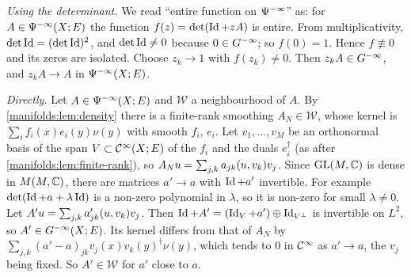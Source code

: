 \subsection*{}
\emph{Using the determinant.} We read ``entire function on $\Psi^{-\infty}$'' as: for
$A\in\Psi^{-\infty}(X;E)$ the function $f(z)=\det(\operatorname{Id}+zA)$ is entire. From multiplicativity,
$\det\operatorname{Id}=(\det\operatorname{Id})^2$, and $\det\operatorname{Id}\ne0$ because $0\in G^{-\infty}$; so $f(0)=1$. Hence $f\not\equiv0$
and its zeros are isolated. Choose $z_k\to1$ with $f(z_k)\ne0$. Then $z_kA\in G^{-\infty}$, and
$z_kA\to A$ in $\Psi^{-\infty}(X;E)$.

\emph{Directly.} Let $A\in\Psi^{-\infty}(X;E)$ and $\mathcal W$ a neighbourhood of $A$. By
\cref{manifolds:lem:density} there is a finite-rank smoothing $A_N\in\mathcal W$, whose kernel is
$\sum_if_i(x)e_i(y)\nu(y)$ with smooth $f_i$, $e_i$. Let $v_1,\dots,v_M$ be an orthonormal basis of the
span $V\subset\mathcal{C}^\infty(X;E)$ of the $f_i$ and the duals $e_i^\dagger$ (as after
\cref{manifolds:lem:finite-rank}), so $A_Nu=\sum_{j,k}a_{jk}( u, v_k)v_j$. Since
$\operatorname{GL}(M,\mathbb{C})$ is dense in $M(M,\mathbb{C})$, there are matrices $a'\to a$ with $\operatorname{Id}+a'$ invertible.
For example $\det(\operatorname{Id}+a+\lambda\operatorname{Id})$ is a non-zero polynomial in $\lambda$, so it is non-zero for
small $\lambda\ne0$. Let $A'u=\sum_{j,k}a'_{jk}( u, v_k)v_j$. Then
$\operatorname{Id}+A'=(\operatorname{Id}_V+a')\oplus\operatorname{Id}_{V^\perp}$ is invertible on $L^2$, so $A'\in G^{-\infty}(X;E)$. Its kernel
differs from that of $A_N$ by $\sum_{j,k}(a'-a)_{jk}v_j(x)v_k(y)^\dagger\nu(y)$, which tends to $0$ in
$\mathcal{C}^\infty$ as $a'\to a$, the $v_j$ being fixed. So $A'\in\mathcal W$ for $a'$ close to $a$.


